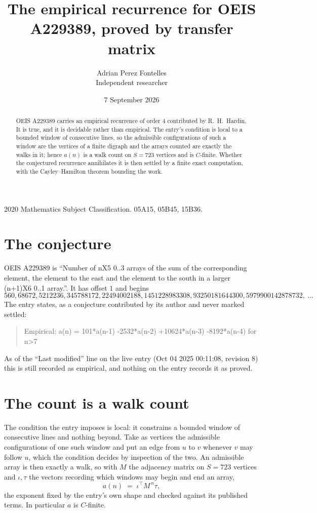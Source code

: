 \documentclass[11pt,a4paper]{article}
\title{The empirical recurrence for OEIS A229389, proved by transfer matrix}
\author{Adrian Perez Fontelles\\ \small Independent researcher}
\date{7 September 2026}
\theoremstyle{plain}
\theoremstyle{definition}
\begin{document}
\maketitle

\begin{abstract}
OEIS A229389 carries an empirical recurrence of order $4$ contributed by R.~H.~Hardin. It is
true, and it is decidable rather than empirical. The entry's condition is local to a bounded window of consecutive lines, so
the admissible configurations of such a window are the vertices of a finite digraph and the
arrays counted are exactly the walks in it; hence $a(n)$ is a walk count on $S=723$ vertices
and is $C$-finite. Whether the conjectured recurrence annihilates it is then settled by a
finite exact computation, with the Cayley--Hamilton theorem bounding the work.
\end{abstract}

\noindent\small 2020 Mathematics Subject Classification. 05A15, 05B45, 15B36.\normalsize

\section{The conjecture}

OEIS A229389 is ``Number of nX5 0..3 arrays of the sum of the corresponding element, the element to the east and the element to the south in a larger (n+1)X6 0..1 array.''. It has offset $1$ and begins
\[
560, 68672, 5212236, 345788172, 22494002188, 1451228983308, 93250181644300, 5979900142878732,\ \dots
\]
The entry states, as a conjecture contributed by its author and never marked settled:
\begin{quote}
Empirical: a(n) = 101*a(n-1) -2532*a(n-2) +10624*a(n-3) -8192*a(n-4) for n>7
\end{quote}
As of the ``Last modified'' line on the live entry (Oct 04 2025 00:11:08, revision 8) this is still
recorded as empirical, and nothing on the entry records it as proved.

\section{The count is a walk count}

The condition the entry imposes is local: it constrains a bounded window of consecutive lines and nothing beyond. Take as
vertices the admissible configurations of one such window and put an edge from $u$ to $v$
whenever $v$ may follow $u$, which the condition decides by inspection of the two. An
admissible array is then exactly a walk, so with $M$ the adjacency matrix on $S=723$ vertices
and $\iota,\tau$ the vectors recording which windows may begin and end an array,
\[
a(n)\;=\;\iota^{\!\top}M^{\,n}\tau ,
\]
the exponent fixed by the entry's own shape and checked against its published terms. In
particular $a$ is $C$-finite.
\end{document}
